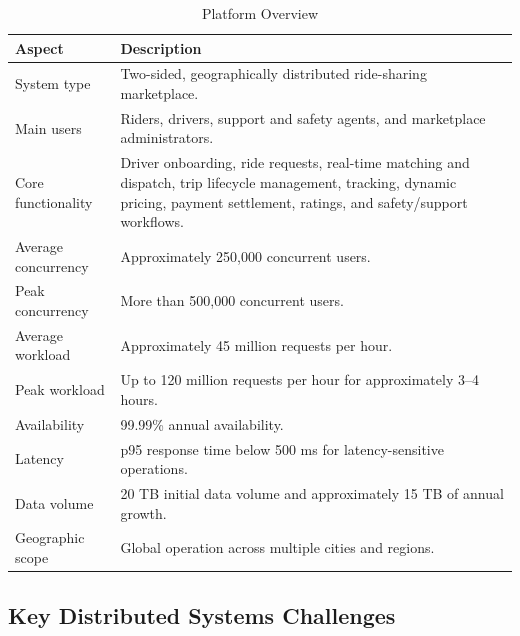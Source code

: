 \begin{table}[H]
\centering
\caption{Platform Overview}
\label{tab:platform-overview}
\begin{tabular}{|p{}|p{}|}
\hline
\textbf{Aspect} & \textbf{Description} \\ \hline

System type &
Two-sided, geographically distributed ride-sharing marketplace. \\ \hline

Main users &
Riders, drivers, support and safety agents, and marketplace administrators. \\ \hline

Core functionality &
Driver onboarding, ride requests, real-time matching and dispatch, trip lifecycle management, tracking, dynamic pricing, payment settlement, ratings, and safety/support workflows. \\ \hline

Average concurrency &
Approximately 250,000 concurrent users. \\ \hline

Peak concurrency &
More than 500,000 concurrent users. \\ \hline

Average workload &
Approximately 45 million requests per hour. \\ \hline

Peak workload &
Up to 120 million requests per hour for approximately 3--4 hours. \\ \hline

Availability &
99.99\% annual availability. \\ \hline

Latency &
p95 response time below 500 ms for latency-sensitive operations. \\ \hline

Data volume &
20 TB initial data volume and approximately 15 TB of annual growth. \\ \hline

Geographic scope &
Global operation across multiple cities and regions. \\ \hline

\end{tabular}
\end{table}

\subsection{Key Distributed Systems Challenges}

